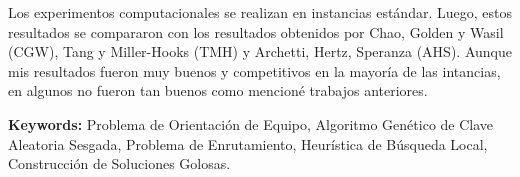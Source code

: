 \bigskip

Los experimentos computacionales se realizan en instancias estándar. Luego, estos resultados se compararon con los resultados obtenidos por Chao, Golden y Wasil (CGW), Tang y Miller-Hooks (TMH) y Archetti, Hertz, Speranza (AHS). Aunque mis resultados fueron muy buenos y competitivos en la mayoría de las intancias, en algunos no fueron tan buenos como mencioné trabajos anteriores.

\bigskip

\noindent\textbf{Keywords:} Problema de Orientación de Equipo, Algoritmo Genético de Clave Aleatoria Sesgada, Problema de Enrutamiento, Heurística de Búsqueda Local, Construcción de Soluciones Golosas.